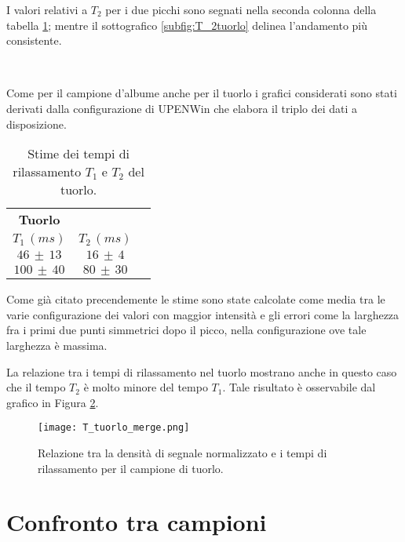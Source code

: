 I valori relativi a $T_2$ per i due picchi sono segnati nella seconda colonna della tabella \ref{tab:Tuorlo}; mentre il sottografico \ref{subfig:T_2tuorlo} delinea l'andamento più consistente.

\begin{figure}
\centering
{} \quad
{} \\
\caption{}
\label{fig:T_tuorlo}
\end{figure}

Come per il campione d'albume anche per il tuorlo i grafici considerati sono stati derivati dalla configurazione di UPENWin che elabora il triplo dei dati a disposizione.

\begin{table}[h!]
	\centering
	\begin{tabular}{ccc}
	\toprule
					\textbf{Tuorlo}	\\
		$T_1\,(ms)$ 		& 		$T_2\,(ms)$ 		\\	
	\midrule
		$46\,\pm\,13$		&		$16\,\pm\,4$		\\
		$100\,\pm\,40$		&		$80\,\pm\,30$		\\
	\bottomrule
	\end{tabular}
	\caption{Stime dei tempi di rilassamento $T_1$ e $T_2$ del tuorlo.}	
	\label{tab:Tuorlo}
\end{table}

Come già citato precendemente le stime sono state calcolate come media tra le varie configurazione dei valori con maggior intensità e gli errori come la larghezza fra i primi due punti simmetrici dopo il picco, nella configurazione ove tale larghezza è massima.

La relazione tra i tempi di rilassamento nel tuorlo mostrano anche in questo caso che il tempo $T_2$ è molto minore del tempo $T_1$. 
Tale risultato è osservabile dal grafico in Figura \ref{fig:Tuorlo}.

\begin{figure}
\centering
\texttt{[image: T\_tuorlo\_merge.png]}
\caption{Relazione tra la densità di segnale normalizzato e i tempi di rilassamento per il campione di tuorlo.}
\label{fig:Tuorlo}
\end{figure}


\section*{Confronto tra campioni}

